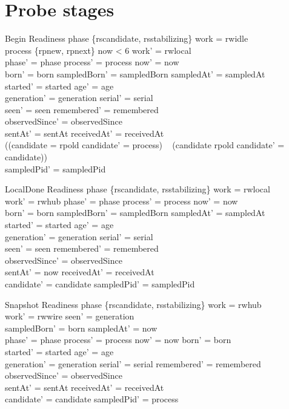 \documentclass[a4paper,10pt,fleqn]{article}
\begin{document}
\section{Probe stages}
\begin{schema}{Begin}
  \Delta Readiness
\where
  phase \in \{rscandidate, rsstabilizing\} \land work = rwidle \\
  process \in \{rpnew, rpnext\} \land now < 6 \land work' = rwlocal \\
  phase' = phase \land process' = process \land now' = now \\
  born' = born \land sampledBorn' = sampledBorn \land sampledAt' = sampledAt \\
  started' = started \land age' = age \\
  generation' = generation \land serial' = serial \\
  seen' = seen \land remembered' = remembered \\
  observedSince' = observedSince \\
  sentAt' = sentAt \land receivedAt' = receivedAt \\
  ((candidate = rpold \land candidate' = process) \lor
  \quad~ (candidate \neq rpold \land candidate' = candidate)) \\
  sampledPid' = sampledPid
\end{schema}
\begin{schema}{LocalDone}
  \Delta Readiness
\where
  phase \in \{rscandidate, rsstabilizing\} \land work = rwlocal \\
  work' = rwhub \land phase' = phase \land process' = process \land now' = now \\
  born' = born \land sampledBorn' = sampledBorn \land sampledAt' = sampledAt \\
  started' = started \land age' = age \\
  generation' = generation \land serial' = serial \\
  seen' = seen \land remembered' = remembered \\
  observedSince' = observedSince \\
  sentAt' = now \land receivedAt' = receivedAt \\
  candidate' = candidate \land sampledPid' = sampledPid
\end{schema}
\begin{schema}{Snapshot}
  \Delta Readiness
\where
  phase \in \{rscandidate, rsstabilizing\} \land work = rwhub \\
  work' = rwwire \land seen' = generation \\
  sampledBorn' = born \land sampledAt' = now \\
  phase' = phase \land process' = process \land now' = now \land born' = born \\
  started' = started \land age' = age \\
  generation' = generation \land serial' = serial \land remembered' = remembered \\
  observedSince' = observedSince \\
  sentAt' = sentAt \land receivedAt' = receivedAt \\
  candidate' = candidate \land sampledPid' = process
\end{schema}
\end{document}
